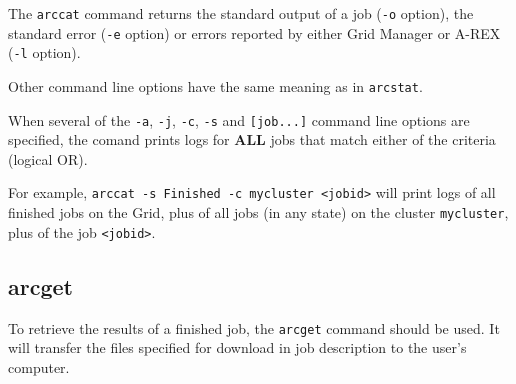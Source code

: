 The \texttt{arccat} command returns the standard output of a job
(\texttt{-o} option), the standard error (\texttt{-e} option) or
errors reported by either Grid Manager or A-REX (\texttt{-l} option).

Other command line options have the same meaning as in \verb#arcstat#.

\begin{framed}
  When several of the \verb#-a#,  \verb#-j#, \verb#-c#, \verb#-s# and \verb#[job...]#
  command line options are specified, the comand prints logs for \textbf{ALL} jobs that
  match either of the criteria (logical OR).

  For example, \verb#arccat -s Finished -c mycluster <jobid># will print logs of all finished
  jobs on the Grid, plus of all jobs (in any state) on the cluster \verb#mycluster#, plus of the job \verb#<jobid>#.
\end{framed}


\subsection{arcget}
\label{sec:arcget}

To retrieve the results of a finished job, the \texttt{arcget}
 command should be used. It
will transfer the files specified for download in job description
to the user's computer.

